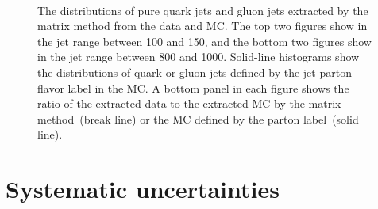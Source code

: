 \begin{figure}[htb]
  \centering
   \quad
   \\
   \quad
  \caption[]{
    The \cbeta distributions of pure  quark jets and %
     gluon jets %
    extracted by the matrix method from the data and MC. %
    The top two figures show \cbeta in the jet \pt range between 100 and 150\GeV, and %
    the bottom two figures show \cbeta in the jet \pt range between 800 and 1000\GeV. %
    Solid-line histograms show the \cbeta distributions of quark or gluon jets defined by the jet parton flavor label in the MC.
    A bottom panel in each figure shows the ratio of the extracted data to the extracted MC by the matrix method~(break line) %
    or the MC defined by the parton label~(solid line). %
    \label{fig:QG-C1B02Data}
    }
\end{figure}


\section{Systematic uncertainties}
\label{sec:QG-syst}

